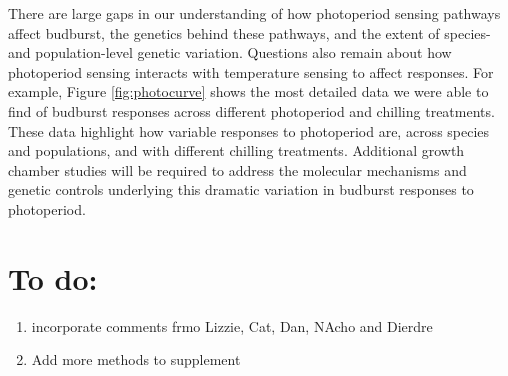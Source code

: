 \documentclass{article}
\begin{document}
\par There are large gaps in our understanding of how photoperiod sensing pathways affect budburst, the genetics behind these pathways, and the extent of species- and population-level genetic variation. Questions also remain about how photoperiod sensing interacts with temperature sensing to affect responses. For example, Figure \ref{fig:photocurve} shows the most detailed data we were able to find of budburst responses across different photoperiod and chilling treatments. These data highlight how variable responses to photoperiod are, across species and populations, and with different chilling treatments. Additional growth chamber studies will be required to address the molecular mechanisms and genetic controls underlying this dramatic variation in  budburst responses to photoperiod. 

\section* {To do:}
\begin{enumerate}
\item incorporate comments frmo Lizzie, Cat, Dan, NAcho and Dierdre
\item Add more methods to supplement
\end{enumerate}


\clearpage
\end{document}
